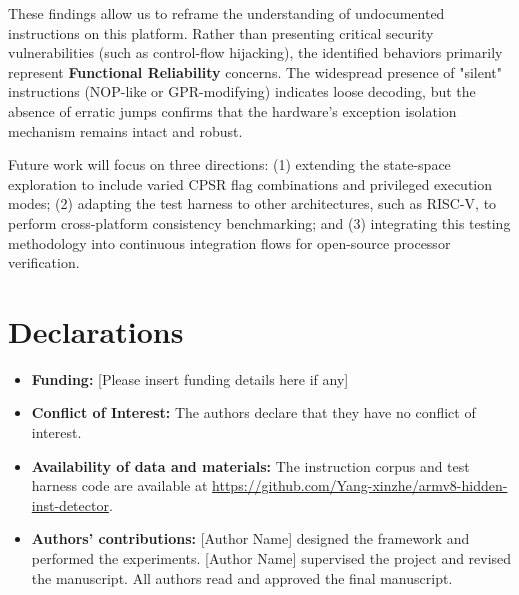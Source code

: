 \documentclass[pdflatex,sn-mathphys]{sn-jnl}%
\theoremstyle{thmstyleone}%
\theoremstyle{thmstyletwo}%
\theoremstyle{thmstylethree}%
\begin{document}
These findings allow us to reframe the understanding of undocumented instructions on this platform. Rather than presenting critical security vulnerabilities (such as control-flow hijacking), the identified behaviors primarily represent \textbf{Functional Reliability} concerns. The widespread presence of "silent" instructions (NOP-like or GPR-modifying) indicates loose decoding, but the absence of erratic jumps confirms that the hardware's exception isolation mechanism remains intact and robust.

Future work will focus on three directions: (1) extending the state-space exploration to include varied CPSR flag combinations and privileged execution modes; (2) adapting the test harness to other architectures, such as RISC-V, to perform cross-platform consistency benchmarking; and (3) integrating this testing methodology into continuous integration flows for open-source processor verification.

\backmatter

\section*{Declarations}

\begin{itemize}
\item \textbf{Funding:} [Please insert funding details here if any]
\item \textbf{Conflict of Interest:} The authors declare that they have no conflict of interest.
\item \textbf{Availability of data and materials:} The instruction corpus and test harness code are available at \url{https://github.com/Yang-xinzhe/armv8-hidden-inst-detector}.
\item \textbf{Authors' contributions:} [Author Name] designed the framework and performed the experiments. [Author Name] supervised the project and revised the manuscript. All authors read and approved the final manuscript.
\end{itemize}



\end{document}
